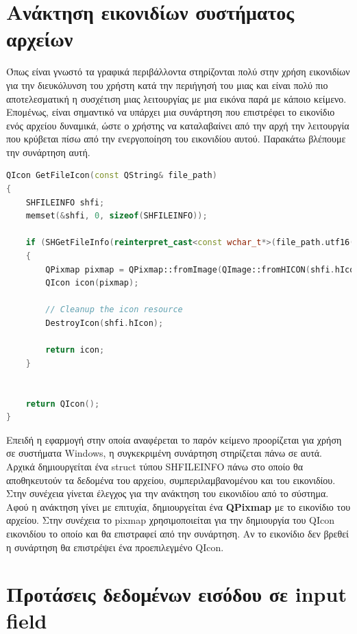 \section{Ανάκτηση εικονιδίων συστήματος αρχείων}
Όπως είναι γνωστό τα γραφικά περιβάλλοντα στηρίζονται πολύ στην χρήση εικονιδίων
για την διευκόλυνση του χρήστη κατά την περιήγησή του μιας και είναι πολύ πιο
αποτελεσματική η συσχέτιση μιας λειτουργίας με μια εικόνα παρά με κάποιο κείμενο.
Επομένως, είναι σημαντικό να υπάρχει μια συνάρτηση που επιστρέφει το εικονίδιο
ενός αρχείου δυναμικά, ώστε ο χρήστης να καταλαβαίνει από την αρχή την λειτουργία που
κρύβεται πίσω από την ενεργοποίηση του εικονιδίου αυτού. Παρακάτω βλέπουμε την συνάρτηση αυτή.


\begin{lstlisting}[language=C++, style=cppstyle]
QIcon GetFileIcon(const QString& file_path)
{
    SHFILEINFO shfi;
    memset(&shfi, 0, sizeof(SHFILEINFO));

    if (SHGetFileInfo(reinterpret_cast<const wchar_t*>(file_path.utf16()), 0, &shfi, sizeof(SHFILEINFO), SHGFI_ICON | SHGFI_USEFILEATTRIBUTES))
    {
        QPixmap pixmap = QPixmap::fromImage(QImage::fromHICON(shfi.hIcon)).scaled(QSize(PercentToWidth(6.66), PercentToHeight(11.85)), Qt::KeepAspectRatio, Qt::SmoothTransformation);
        QIcon icon(pixmap);

        // Cleanup the icon resource
        DestroyIcon(shfi.hIcon);

        return icon;
    }

    
    return QIcon();
}
\end{lstlisting}

Επειδή η εφαρμογή στην οποία αναφέρεται το παρόν κείμενο προορίζεται για χρήση σε
συστήματα Windows, η συγκεκριμένη συνάρτηση στηρίζεται πάνω σε αυτά. Αρχικά
δημιουργείται ένα struct τύπου SHFILEINFO πάνω στο οποίο θα αποθηκευτούν τα
δεδομένα του αρχείου, συμπεριλαμβανομένου και του εικονιδίου. Στην συνέχεια γίνεται
έλεγχος για την ανάκτηση του εικονιδίου από το σύστημα. Αφού η ανάκτηση γίνει με
επιτυχία, δημιουργείται ένα \textbf{QPixmap} με το εικονίδιο του αρχείου. Στην 
συνέχεια το pixmap χρησιμοποιείται για την δημιουργία του QIcon εικονιδίου το
οποίο και θα επιστραφεί από την συνάρτηση. Αν το εικονίδιο δεν βρεθεί η συνάρτηση
θα επιστρέψει ένα προεπιλεγμένο QIcon.


\section{Προτάσεις δεδομένων εισόδου σε input field}

